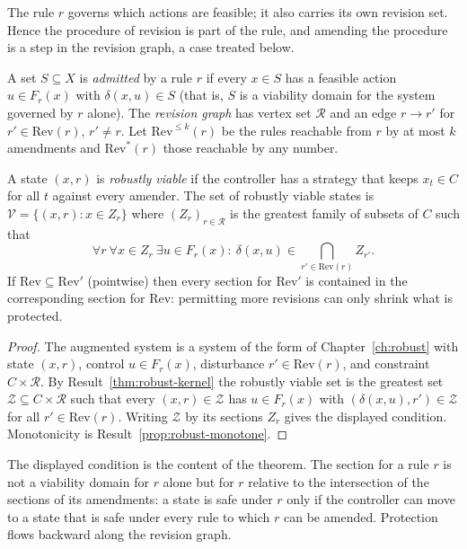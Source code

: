 The rule $r$ governs which actions are feasible; it also carries its own revision set. Hence the procedure of revision is part of the rule, and amending the procedure is a step in the revision graph, a case treated below.

A set $S\subseteq X$ is \emph{admitted} by a rule $r$ if every $x\in S$ has a feasible action $u\in F_r(x)$ with $\delta(x,u)\in S$ (that is, $S$ is a viability domain for the system governed by $r$ alone). The \emph{revision graph} has vertex set $\mathcal R$ and an edge $r\to r'$ for $r'\in\mathrm{Rev}(r)$, $r'\ne r$. Let $\mathrm{Rev}^{\le k}(r)$ be the rules reachable from $r$ by at most $k$ amendments and $\mathrm{Rev}^{*}(r)$ those reachable by any number.

\begin{newresult}\label{thm:rule-kernel}
A state $(x,r)$ is \emph{robustly viable} if the controller has a strategy that keeps $x_t\in C$ for all $t$ against every amender. The set of robustly viable states is $\mathcal V=\{(x,r):x\in Z_r\}$ where $(Z_r)_{r\in\mathcal R}$ is the greatest family of subsets of $C$ such that
\[
\forall r\ \forall x\in Z_r\ \exists u\in F_r(x):\ \delta(x,u)\in\bigcap_{r'\in\mathrm{Rev}(r)}Z_{r'}.
\]
If $\mathrm{Rev}\subseteq\mathrm{Rev}'$ (pointwise) then every section for $\mathrm{Rev}'$ is contained in the corresponding section for $\mathrm{Rev}$: permitting more revisions can only shrink what is protected.
\end{newresult}
\begin{proof}
The augmented system is a system of the form of Chapter~\ref{ch:robust} with state $(x,r)$, control $u\in F_r(x)$, disturbance $r'\in\mathrm{Rev}(r)$, and constraint $C\times\mathcal R$. By Result~\ref{thm:robust-kernel} the robustly viable set is the greatest set $\mathcal Z\subseteq C\times\mathcal R$ such that every $(x,r)\in\mathcal Z$ has $u\in F_r(x)$ with $(\delta(x,u),r')\in\mathcal Z$ for all $r'\in\mathrm{Rev}(r)$. Writing $\mathcal Z$ by its sections $Z_r$ gives the displayed condition. Monotonicity is Result~\ref{prop:robust-monotone}.
\end{proof}

The displayed condition is the content of the theorem. The section for a rule $r$ is not a viability domain for $r$ alone but for $r$ relative to the intersection of the sections of its amendments: a state is safe under $r$ only if the controller can move to a state that is safe under every rule to which $r$ can be amended. Protection flows backward along the revision graph.

